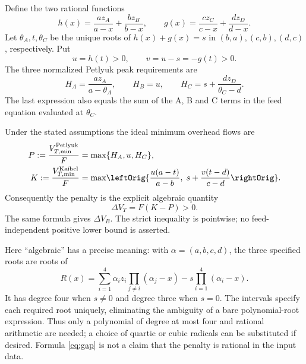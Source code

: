 \documentclass[11pt,a4paper]{report}
\begin{document}
Define the two rational functions
\begin{equation}\label{eq:hg}
 h(x)=\frac{az_A}{a-x}+\frac{bz_B}{b-x},\qquad
 g(x)=\frac{cz_C}{c-x}+\frac{dz_D}{d-x}.
\end{equation}
Let \(\theta_A,t,\theta_C\) be the unique roots of \(h(x)+g(x)=s\) in
\((b,a),(c,b),(d,c)\), respectively. Put
\begin{equation}\label{eq:uv}
 u=h(t)>0,\qquad v=u-s=-g(t)>0.
\end{equation}
The three normalized Petlyuk peak requirements are
\begin{equation}\label{eq:peaks}
 H_A=\frac{az_A}{a-\theta_A},\qquad H_B=u,\qquad
 H_C=s+\frac{dz_D}{\theta_C-d}.
\end{equation}
The last expression also equals the sum of the A, B and C terms in the
feed equation evaluated at \(\theta_C\).

\begin{theorem}[note=Known comparison in the Underwood model]\label{thm:gap}
Under the stated assumptions the ideal minimum overhead flows are
\begin{align}
 P:=\frac{V_{T,\min}^{\rm Petlyuk}}F
     &=\max\{H_A,u,H_C\},\label{eq:P}\\
 K:=\frac{V_{T,\min}^{\rm Kaibel}}F
     &=\max\left\{\frac{u(a-t)}{a-b},\;
                 s+\frac{v(t-d)}{c-d}\right\}.\label{eq:K}
\end{align}
Consequently the penalty is the explicit algebraic quantity
\begin{equation}\label{eq:gap}
 \Delta V_T=F(K-P)>0.
\end{equation}
The same formula gives \(\Delta V_B\). The strict inequality is pointwise;
no feed-independent positive lower bound is asserted.
\end{theorem}

Here ``algebraic'' has a precise meaning: with
\(\alpha=(a,b,c,d)\), the three specified roots are roots of
\begin{equation}\label{eq:polynomial}
 R(x)=\sum_{i=1}^4\alpha_i z_i
             \prod_{j\ne i}(\alpha_j-x)
             -s\prod_{i=1}^4(\alpha_i-x).
\end{equation}
It has degree four when \(s\ne0\) and degree three when \(s=0\).
The intervals specify each required root uniquely, eliminating the ambiguity
of a bare polynomial-root expression. Thus only a polynomial of degree at
most four and rational arithmetic are needed; a choice of quartic or cubic
radicals can be substituted if desired. Formula \eqref{eq:gap} is not a
claim that the penalty is rational in the input data.
\end{document}
